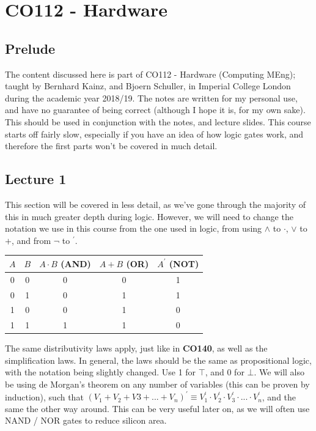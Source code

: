 \documentclass[a4paper, 12pt]{article}
\begin{document}
    \section*{CO112 - Hardware}
        \subsection*{Prelude}
            The content discussed here is part of CO112 - Hardware (Computing MEng); taught by Bernhard Kainz, and Bjoern Schuller, in Imperial College London during the academic year 2018/19. The notes are written for my personal use, and have no guarantee of being correct (although I hope it is, for my own sake). This should be used in conjunction with the notes, and lecture slides. This course starts off fairly slow, especially if you have an idea of how logic gates work, and therefore the first parts won't be covered in much detail.
        \subsection*{Lecture 1}
            This section will be covered in less detail, as we've gone through the majority of this in much greater depth during logic. However, we will need to change the notation we use in this course from the one used in logic, from using $\land$ to $\cdot$, $\lor$ to $+$, and from $\neg$ to $^\prime$.
            \begin{center}
                \begin{tabular}{cc|c|c|c}
                    $A$ & $B$ & $A \cdot B$ (AND) & $A + B$ (OR) & $A^\prime$ (NOT) \\
                    \hline
                    0 & 0 & 0 & 0 & 1 \\
                    0 & 1 & 0 & 1 & 1 \\
                    1 & 0 & 0 & 1 & 0 \\
                    1 & 1 & 1 & 1 & 0
                \end{tabular}
            \end{center}
            The same distributivity laws apply, just like in \textbf{CO140}, as well as the simplification laws. In general, the laws should be the same as propositional logic, with the notation being slightly changed. Use 1 for $\top$, and 0 for $\bot$. We will also be using de Morgan's theorem on any number of variables (this can be proven by induction), such that $(V_1 + V_2 + V3 + ... + V_n)^\prime \equiv V_1^\prime \cdot V_2^\prime \cdot V_3^\prime \cdot ... \cdot V_n^\prime$, and the same the other way around. This can be very useful later on, as we will often use NAND / NOR gates to reduce silicon area.
\end{document}

